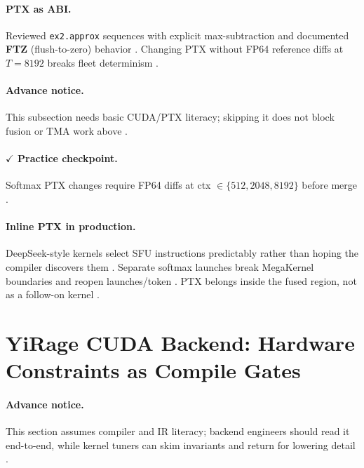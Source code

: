 \paragraph{PTX as ABI.}
Reviewed \texttt{ex2.approx} sequences with explicit max-subtraction and documented \textbf{FTZ} (flush-to-zero) behavior \citep{liu2024deepseekv3,patel2025llminference}.
Changing PTX without FP64 reference diffs at $T{=}8192$ breaks fleet determinism \citep{dao2023flashdecoding,yirage2026}.

\paragraph{Advance notice.}
This subsection needs basic CUDA/PTX literacy; skipping it does not block fusion or TMA work above \citep{dlbook}.

\paragraph{$\checkmark$ Practice checkpoint.}
Softmax PTX changes require FP64 diffs at ctx $\in\{512,2048,8192\}$ before merge \citep{dao2022flashattention,yirage2026}.

\paragraph{Inline PTX in production.}
DeepSeek-style kernels select SFU instructions predictably rather than hoping the compiler discovers them \citep{liu2024deepseekv3,yirage2026}.
Separate softmax launches break MegaKernel boundaries and reopen launches/token \citep{taxbreak2026,memoryfloor2026,dao2022flashattention}.
PTX belongs inside the fused region, not as a follow-on kernel \citep{yirage2026,chen2020compilerbasedhardw}.

\section{YiRage CUDA Backend: Hardware Constraints as Compile Gates}
\label{sec:ch04_yirage_cuda_backend}

\paragraph{Advance notice.}
This section assumes compiler and IR literacy; backend engineers should read it end-to-end, while kernel tuners can skim invariants and return for lowering detail \citep{chen2020compilerbasedhardw,yirage2026}.

